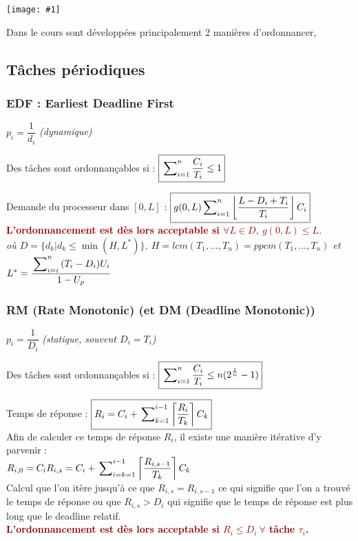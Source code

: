 \documentclass{article}
\newcommand{\dred}[1]{\textcolor{darkred}{\textbf{#1}}}
\newcommand{\ceil}[1]{\left\lceil #1 \right\rceil}
\newcommand{\cdil}[1]{\left\lfloor #1 \right\rfloor}
\newcommand{\imgR}[2]{\begin{center}\texttt{[image: \#1]}\end{center}}
\newcommand{\sumin}[3]{\sideset{}{_{i=#1}^{#2}}\sum{#3}}
\newcommand{\sumkn}[3]{\sideset{}{_{k=#1}^{#2}}\sum{#3}}
\begin{document}
\imgR{img/ITR_023.png}{200}

Dans le cours sont développées principalement 2 manières d'ordonnancer,

\subsection{Tâches périodiques}

\subsubsection{EDF : Earliest Deadline First}

\begin{center}$\boxed{p_i = \dfrac{1}{d_i}}$ \textit{(dynamique)}\end{center}

Des tâches sont ordonnançables si : $\boxed{\sideset{}{_{i=1}^n}\sum{\dfrac{C_i}{T_i}} \leq 1}$

Demande du processeur dans $[0,L]$ : $\boxed{g(0,L)\sumin{1}{n}{\cdil{\dfrac{L-D_i+T_i}{T_i}}C_i}}$ \\

\noindent\dred{L'ordonnancement est dès lors acceptable si $\forall L \in D,\ g(0,L) \leq L$}.\\
\textit{où $D =\{d_k|d_k\leq \min{(H,L^*)}\}$, $H = lcm(T_1,...,T_n)=ppcm(T_1,...,T_n)$ et
$L^*=\dfrac{\sumin{i}{n}{(T_i-D_i)U_i}}{1-U_p}$}

\subsubsection{RM (Rate Monotonic) (et DM (Deadline Monotonic))}

\begin{center}$\boxed{p_i = \dfrac{1}{D_i}}$ \textit{(statique, souvent $D_i=T_i$)}\end{center}

Des tâches sont ordonnançables si : $\boxed{\sideset{}{_{i=1}^n}\sum{\dfrac{C_i}{T_i}} \leq n(2^{\frac{1}
{n}}-1)}$

Temps de réponse : $\boxed{R_i = C_i + \sumkn{1}{i-1}{\ceil{\dfrac{R_i}{T_k}} C_k}}$ \\
Afin de calculer ce temps de réponse $R_i$, il existe une manière itérative d'y parvenir : \\
$R_{i,0} = C_i \\
 R_{i,s} = C_i + \sumin{k=1}{i-1}{\ceil{\dfrac{R_{i,s-1}}{T_k}} C_k}$ \\
 
Calcul que l'on itère jusqu'à ce que $R_{i,s} = R_{i,s-1}$ ce qui signifie que l'on a trouvé le temps de réponse
ou que $R_{i,s} > D_i$ qui signifie que le temps de réponse est plus long que le deadline relatif. \\
 
\noindent\dred{L'ordonnancement est dès lors acceptable si $R_i \leq D_i\ \forall$ tâche $\tau_i$.}
 
\end{document}
